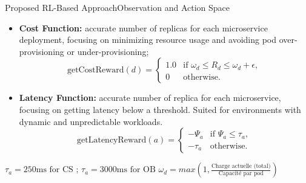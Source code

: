 \documentclass{beamer}
\begin{document}
\begin{frame}{Proposed RL-Based Approach}{Observation and Action Space}

    \begin{itemize}
        \item \textbf{Cost Function:} accurate number of replicas for each microservice deployment, focusing on minimizing resource usage and avoiding pod over-provisioning or under-provisioning;        
        \begin{equation}
            \text{getCostReward}(d) =
            \begin{cases} 
                1.0 & \text{if } \omega_d \leq R_d \leq \omega_d + \epsilon, \\
                0 & \text{otherwise.}
            \end{cases}
            \label{eq:cost-reward}
        \end{equation}
        \item \textbf{Latency Function:} accurate number of replica for each microservice, focusing on getting latency below a threshold. Suited for environments with dynamic and unpredictable workloads.        
        \begin{equation}
            \text{getLatencyReward}(a) =
            \begin{cases}
                -\Psi_a & \text{if } \Psi_a \leq \tau_a, \\
                -\tau_a & \text{otherwise.}
            \end{cases}
            \label{eq:latency-reward}
        \end{equation}
    \end{itemize}

    \textit{$\tau_a = 250\text{ms for CS ; } \tau_a = 3000\text{ms for OB}$}
    \textit{$\omega_d = max(1, \frac{\text{Charge actuelle (total)}}{\text{Capacité  par pod}})$}

\end{frame}
\end{document}
